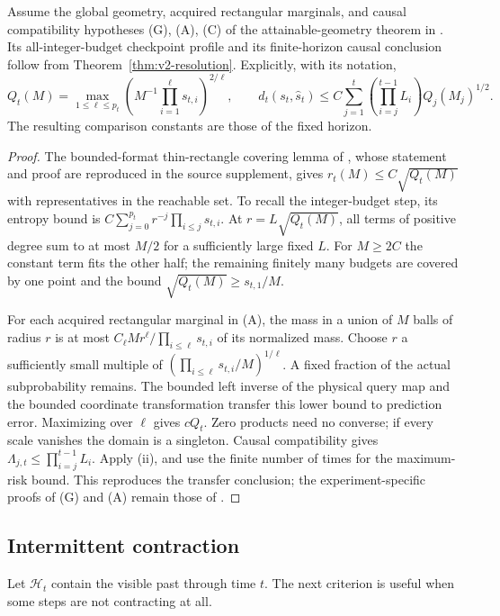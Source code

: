 \begin{corollary}\label{cor:v2-a1}
Assume the global geometry, acquired rectangular marginals, and causal
compatibility hypotheses \textup{(G)}, \textup{(A)}, \textup{(C)} of the
attainable-geometry theorem in \cite{QiA1}. Its all-integer-budget
checkpoint profile and its finite-horizon causal conclusion follow from
Theorem~\ref{thm:v2-resolution}. Explicitly, with its notation,
\[
 Q_t(M)=\max_{1\le\ell\le p_t}
 \left(M^{-1}\prod_{i=1}^{\ell}s_{t,i}\right)^{2/\ell},
 \qquad
 d_t(s_t,\widehat s_t)\le C\sum_{j=1}^t
       \left(\prod_{i=j}^{t-1}L_i\right)Q_j(M_j)^{1/2}.
\]
The resulting comparison constants are those of the fixed horizon.
\end{corollary}
\begin{proof}
The bounded-format thin-rectangle covering lemma of \cite{QiA1}, whose
statement and proof are reproduced in the source supplement, gives
$r_t(M)\le C\sqrt{Q_t(M)}$ with representatives in the reachable set.
To recall the integer-budget step, its entropy bound is
$C\sum_{j=0}^{p_t}r^{-j}\prod_{i\le j}s_{t,i}$.
At $r=L\sqrt{Q_t(M)}$, all terms of positive degree sum to at most
$M/2$ for a sufficiently large fixed $L$. For $M\ge2C$ the constant
term fits the other half; the remaining finitely many budgets are
covered by one point and the bound $\sqrt{Q_t(M)}\ge s_{t,1}/M$.

For each acquired rectangular marginal in (A), the mass in a union of
$M$ balls of radius $r$ is at most
$C_\ell Mr^\ell/\prod_{i\le\ell}s_{t,i}$ of its normalized mass.
Choose $r$ a sufficiently small multiple of
$(\prod_{i\le\ell}s_{t,i}/M)^{1/\ell}$. A fixed fraction of the
actual subprobability remains. The bounded left inverse of the physical
query map and the bounded coordinate transformation transfer this
lower bound to prediction error. Maximizing over $\ell$ gives $cQ_t$.
Zero products need no converse; if every scale vanishes the domain is a
singleton. Causal compatibility gives
$\Lambda_{j,t}\le\prod_{i=j}^{t-1}L_i$.
Apply (ii), and use the finite number of times for the maximum-risk bound.
This reproduces the transfer conclusion; the experiment-specific proofs
of (G) and (A) remain those of \cite{QiA1}.
\end{proof}

\subsection{Intermittent contraction}
Let $\mathcal H_t$ contain the visible past through time $t$. The next
criterion is useful when some steps are not contracting at all.

